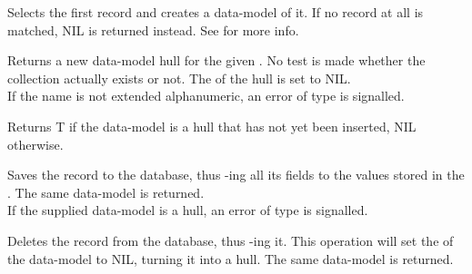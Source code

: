 Selects the first record and creates a data-model of it. If no record at all is matched, NIL is returned instead. See  for more info.

Returns a new data-model hull for the given . No test is made whether the collection actually exists or not. The  of the hull is set to NIL. \\

\noindent If the  name is not extended alphanumeric, an error of type  is signalled.

Returns T if the data-model is a hull that has not yet been inserted, NIL otherwise.

Saves the record to the database, thus -ing all its fields to the values stored in the . The same data-model is returned. \\

\noindent If the supplied data-model is a hull, an error of type  is signalled.

Deletes the record from the database, thus -ing it. This operation will set the  of the data-model to NIL, turning it into a hull. The same data-model is returned.\\

